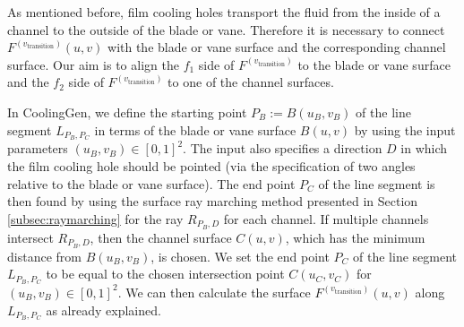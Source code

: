 \documentclass[a4paper, 11pt]{report}
\theoremstyle{definition}
\begin{document}
	As mentioned before, film cooling holes transport the fluid from the inside of a channel to the outside of the blade or vane. Therefore it is necessary to connect $F^{(v_\textrm{transition})}(u,v)$ with the blade or vane surface and the corresponding channel surface. Our aim is to align the $f_1$ side of $F^{(v_\textrm{transition})}$ to the blade or vane surface and the $f_2$ side of $F^{(v_\textrm{transition})}$ to one of the channel surfaces.

	In CoolingGen, we define the starting point $P_B := B(u_B, v_B)$ of the line segment $L_{P_B,P_C}$ in terms of the blade or vane surface $B(u,v)$ by using the input parameters $(u_B, v_B) \in [0,1]^2$. The input also specifies a direction $D$ in which the film cooling hole should be pointed (via the specification of two angles relative to the blade or vane surface). The end point $P_C$ of the line segment is then found by using the surface ray marching method presented in Section \ref{subsec:raymarching} for the ray $R_{P_B,D}$ for each channel. If multiple channels intersect $R_{P_B,D}$, then the channel surface $C(u,v)$, which has the minimum distance from $B(u_B, v_B)$, is chosen. We set the end point $P_C$ of the line segment $L_{P_B,P_C}$ to be equal to the chosen intersection point $C(u_C, v_C)$ for $(u_B, v_B) \in [0,1]^2$. We can then calculate the surface $F^{(v_\textrm{transition})}(u,v)$ along $L_{P_B,P_C}$ as already explained.
\end{document}
